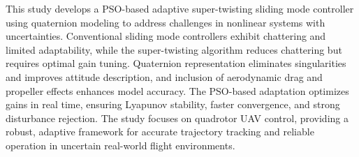 

This study develops a PSO-based adaptive super-twisting sliding mode controller using quaternion modeling to address challenges in nonlinear systems with uncertainties. Conventional sliding mode controllers exhibit chattering and limited adaptability, while the super-twisting algorithm reduces chattering but requires optimal gain tuning. Quaternion representation eliminates singularities and improves attitude description, and inclusion of aerodynamic drag and propeller effects enhances model accuracy. The PSO-based adaptation optimizes gains in real time, ensuring Lyapunov stability, faster convergence, and strong disturbance rejection. The study focuses on quadrotor UAV control, providing a robust, adaptive framework for accurate trajectory tracking and reliable operation in uncertain real-world flight environments.
\\

